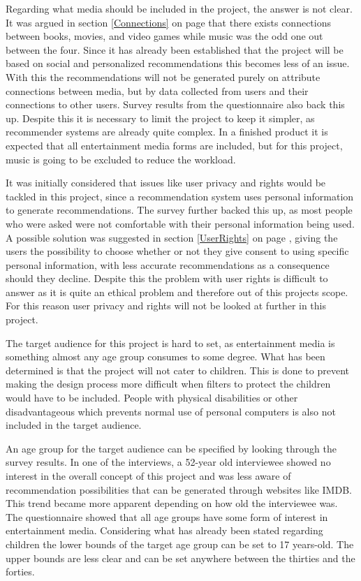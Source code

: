 Regarding what media should be included in the project, the answer is not clear. It was argued in section \ref{Connections} on page \pageref{Connections} that there exists connections between books, movies, and video games while music was the odd one out between the four. Since it has already been established that the project will be based on social and personalized recommendations this becomes less of an issue. With this the recommendations will not be generated purely on attribute connections between media, but by data collected from users and their connections to other users. Survey results from the questionnaire also back this up. Despite this it is necessary to limit the project to keep it simpler, as recommender systems are already quite complex. In a finished product it is expected that all entertainment media forms are included, but for this project, music is going to be excluded to reduce the workload.

It was initially considered that issues like user privacy and rights would be tackled in this project, since a recommendation system uses personal information to generate recommendations. The survey further backed this up, as most people who were asked were not comfortable with their personal information being used. A possible solution was suggested in section \ref{UserRights} on page \pageref{UserRights}, giving the users the possibility to choose whether or not they give consent to using specific personal information, with less accurate recommendations as a consequence should they decline. Despite this the problem with user rights is difficult to answer as it is quite an ethical problem and therefore out of this projects scope. For this reason user privacy and rights will not be looked at further in this project.

The target audience for this project is hard to set, as entertainment media is something almost any age group consumes to some degree. What has been determined is that the project will not cater to children. This is done to prevent making the design process more difficult when filters to protect the children would have to be included. People with physical disabilities or other disadvantageous which prevents normal use of personal computers is also not included in the target audience.

An age group for the target audience can be specified by looking through the survey results. In one of the interviews, a 52-year old interviewee showed no interest in the overall concept of this project and was less aware of recommendation possibilities that can be generated through websites like IMDB. This trend became more apparent depending on how old the interviewee was. The questionnaire showed that all age groups have some form of interest in entertainment media. Considering what has already been stated regarding children the lower bounds of the target age group can be set to 17 years-old. The upper bounds are less clear and can be set anywhere between the thirties and the forties.
